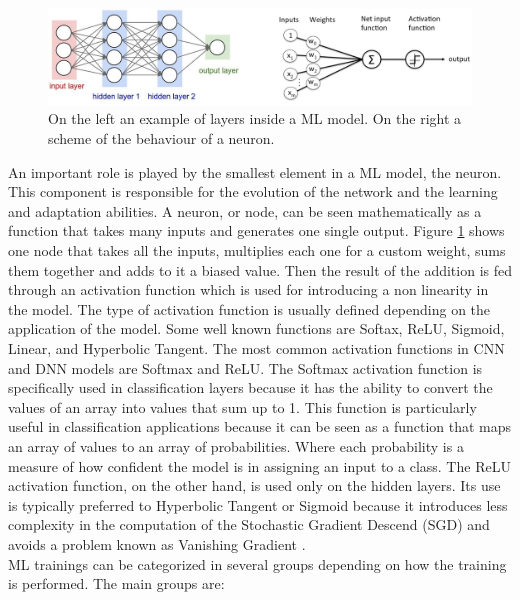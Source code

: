 \documentclass[12pt]{report}
\begin{document}
\begin{figure}[h!]
    \centering
    \includegraphics[width=140mm]{Figures/Chapter1/modelstructure.jpg} 
    \caption{On the left an example of layers inside a ML model. On the right a scheme of the behaviour of a neuron.}
    \label{fig:modelstructure}    
\end{figure}

An important role is played by the smallest element in a ML model, the neuron. This component is responsible for the evolution of the network and the learning and adaptation abilities. A neuron, or node, can be seen mathematically as a function that takes many inputs and generates one single output. Figure \ref{fig:modelstructure} shows one node that takes all the inputs, multiplies each one for a custom weight, sums them together and adds to it a biased value. Then the result of the addition is fed through an activation function which is used for introducing a non linearity in the model. The type of activation function is usually defined depending on the application of the model. Some well known functions are Softax, ReLU, Sigmoid, Linear, and Hyperbolic Tangent. 
The most common activation functions in CNN and DNN models are Softmax and ReLU. 
The Softmax activation function is specifically used in classification layers because it has the ability to convert the values of an array into values that sum up to 1. This function is particularly useful in classification applications because it can be seen as a function that maps an array of values to an array of probabilities. Where each probability is a measure of how confident the model is in assigning an input to a class. The ReLU activation function, on the other hand, is used only on the hidden layers. Its use is typically preferred to Hyperbolic Tangent or Sigmoid because it introduces less complexity in the computation of the Stochastic Gradient Descend (SGD) and avoids a problem known as Vanishing Gradient \cite{ReLU_explanation}.\\
ML trainings can be categorized in several groups depending on how the training is performed. The main groups are:
\end{document}
